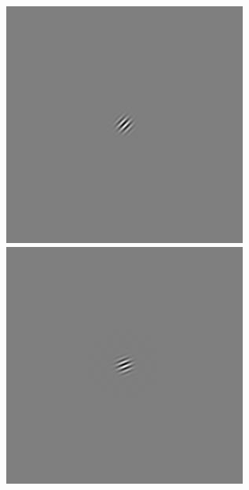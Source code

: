 \begin{figure}[ht]
\begin{center}
 \includegraphics[width=\columnwidth/9]{ch4/figures/iGabor0_2.jpg}
 \includegraphics[width=\columnwidth/9]{ch4/figures/iGabor0_3.jpg}

\end{center}
\end{figure}
